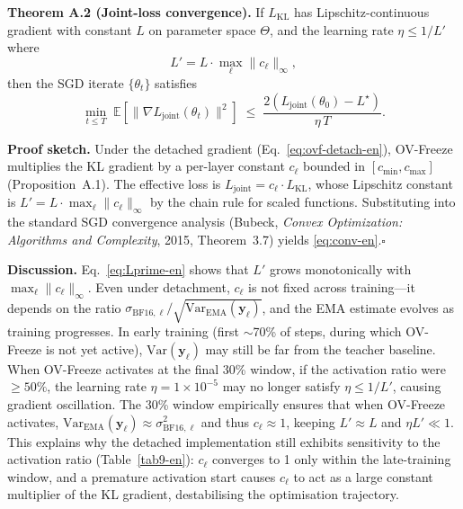 \documentclass[11pt, a4paper]{article}
\begin{document}
\noindent\textbf{Theorem A.2 (Joint-loss convergence).} If $L_{\mathrm{KL}}$ has Lipschitz-continuous gradient with constant $L$ on parameter space $\Theta$, and the learning rate $\eta \le 1/L'$ where
\begin{equation}
\label{eq:Lprime-en}
L' = L\cdot\max_\ell\|c_\ell\|_\infty,
\end{equation}
then the SGD iterate $\{\theta_t\}$ satisfies
\begin{equation}
\label{eq:conv-en}
\min_{t \le T}\;\mathbb{E}\!\left[\|\nabla L_{\mathrm{joint}}(\theta_t)\|^2\right] \;\le\; \frac{2(L_{\mathrm{joint}}(\theta_0) - L^\star)}{\eta\,T}.
\end{equation}

\noindent\textbf{Proof sketch.} Under the detached gradient (Eq.~\eqref{eq:ovf-detach-en}), OV-Freeze multiplies the KL gradient by a per-layer constant $c_\ell$ bounded in $[c_{\min}, c_{\max}]$ (Proposition~A.1). The effective loss is $L_{\mathrm{joint}} = c_\ell \cdot L_{\mathrm{KL}}$, whose Lipschitz constant is $L' = L \cdot \max_\ell\|c_\ell\|_\infty$ by the chain rule for scaled functions. Substituting into the standard SGD convergence analysis (Bubeck, \textit{Convex Optimization: Algorithms and Complexity}, 2015, Theorem~3.7) yields \eqref{eq:conv-en}.\hfill$\square$

\noindent\textbf{Discussion.} Eq.~\eqref{eq:Lprime-en} shows that $L'$ grows monotonically with $\max_\ell\|c_\ell\|_\infty$. Even under detachment, $c_\ell$ is not fixed across training---it depends on the ratio $\sigma_{\mathrm{BF16},\ell} / \sqrt{\mathrm{Var}_{\mathrm{EMA}}(\bm{y}_\ell)}$, and the EMA estimate evolves as training progresses. In early training (first $\sim$70\% of steps, during which OV-Freeze is not yet active), $\mathrm{Var}(\bm{y}_\ell)$ may still be far from the teacher baseline. When OV-Freeze activates at the final 30\% window, if the activation ratio were $\ge 50\%$, the learning rate $\eta = 1\times 10^{-5}$ may no longer satisfy $\eta \le 1/L'$, causing gradient oscillation. The 30\% window empirically ensures that when OV-Freeze activates, $\mathrm{Var}_{\mathrm{EMA}}(\bm{y}_\ell) \approx \sigma^2_{\mathrm{BF16},\ell}$ and thus $c_\ell \approx 1$, keeping $L' \approx L$ and $\eta L' \ll 1$. This explains why the detached implementation still exhibits sensitivity to the activation ratio (Table~\ref{tab9-en}): $c_\ell$ converges to 1 only within the late-training window, and a premature activation start causes $c_\ell$ to act as a large constant multiplier of the KL gradient, destabilising the optimisation trajectory.
\end{document}
